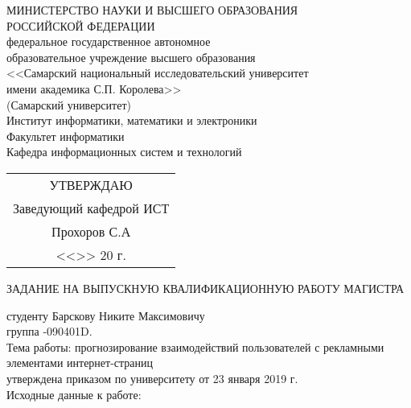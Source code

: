 \thispagestyle{empty}
\begin{center}
МИНИСТЕРСТВО НАУКИ И ВЫСШЕГО ОБРАЗОВАНИЯ \\
РОССИЙСКОЙ ФЕДЕРАЦИИ\vspace{14pt} \\
федеральное государственное автономное \\
образовательное учреждение высшего образования \\
<<Самарский национальный исследовательский университет \\
имени академика С.П. Королева>> \\
(Самарский университет)\vspace{14pt} \\
Институт информатики, математики и электроники \\
Факультет информатики \\
Кафедра информационных систем и технологий\vspace{28pt} \\
\end{center}
\begin{flushright}
    \begin{tabular}{@{}c@{}}
        \onehalfspacing{}
        УТВЕРЖДАЮ\\
        Заведующий кафедрой ИСТ\\
        \underline{\hspace{4cm}} Прохоров С.А\\
        <<\underline{\hspace{0.75cm}}>> \underline{\hspace{4.13cm}} 20\underline{\hspace{0.75cm}} г.
    \end{tabular}
\end{flushright}\vspace{28pt}
\begin{center}
    ЗАДАНИЕ НА ВЫПУСКНУЮ КВАЛИФИКАЦИОННУЮ РАБОТУ МАГИСТРА
\end{center}\vspace{14pt}
\onehalfspacing{}
студенту Барскову Никите Максимовичу \\
группа -090401D. \\
Тема работы: прогнозирование взаимодействий пользователей с рекламными элементами интернет-страниц \\
утверждена приказом по университету  от 23 января 2019 г. \\
Исходные данные к работе: \\
